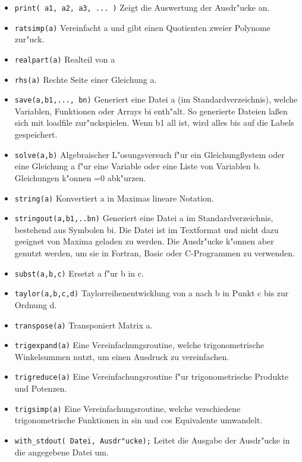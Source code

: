 \documentclass[spanish,12pt,a4paper]{article}
\begin{document}
\begin{itemize}
\item \verb|print( a1, a2, a3, ... )| Zeigt die Auswertung der Ausdr"ucke an.
\item \verb|ratsimp(a)| Vereinfacht a und gibt einen Quotienten zweier Polynome zur"uck.
\item \verb|realpart(a)| Realteil von a
\item \verb|rhs(a)| Rechte Seite einer Gleichung a.
\item \verb|save(a,b1,..., bn)| Generiert eine Datei a (im Standardverzeichnis), welche Variablen, Funktionen oder Arrays bi enth"alt. So generierte Dateien la{\ss}en sich mit loadfile zur"uckspielen. Wenn b1 all ist, wird alles bis auf die Labels gespeichert.
\item \verb|solve(a,b)| Algebraischer L"osungsversuch f"ur ein Gleichung{\ss}ystem oder eine Gleichung a f"ur eine Variable oder eine Liste von Variablen b. Gleichungen k"onnen =0 abk"urzen.
\item \verb|string(a)| Konvertiert a in Maximas lineare Notation.
\item \verb|stringout(a,b1,..bn)| Generiert eine Datei a im Standardverzeichnis, bestehend aus Symbolen bi. Die Datei ist im Textformat und nicht dazu geeignet von Maxima geladen zu werden. Die Ausdr"ucke k"onnen aber genutzt werden, um sie in Fortran, Basic oder C-Programmen zu verwenden.
\item \verb|subst(a,b,c)| Ersetzt a f"ur b in c.
\item \verb|taylor(a,b,c,d)| Taylorreihenentwicklung von a nach b in Punkt c bis zur Ordnung d.
\item \verb|transpose(a)| Transponiert Matrix a.
\item \verb|trigexpand(a)| Eine Vereinfachungsroutine, welche trigonometrische Winkelsummen nutzt, um einen Ausdruck zu vereinfachen.
\item \verb|trigreduce(a)| Eine Vereinfachungsroutine f"ur trigonometrische Produkte und Potenzen.
\item \verb|trigsimp(a)| Eine Vereinfachungsroutine, welche verschiedene trigonometrische Funktionen in sin und cos Equivalente umwandelt.
\item \verb|with_stdout( Datei, Ausdr"ucke);| Leitet die Ausgabe der Ausdr"ucke in die angegebene Datei um.
\end{itemize}
\end{document}

